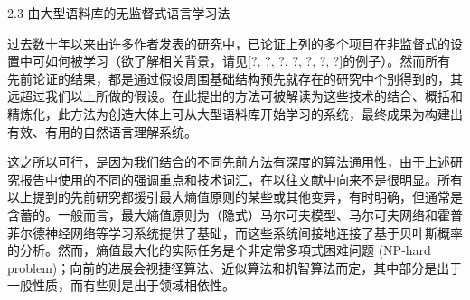 2.3 由大型语料库的无监督式语言学习法

过去数十年以来由许多作者发表的研究中，已论证上列的多个项目在非监督式的设置中可如何被学习（欲了解相关背景，请见[?, ?, ?, ?, ?, ?, ?]的例子）。然而所有先前论证的结果，都是通过假设周围基础结构预先就存在的研究中个别得到的，其远超过我们以上所做的假设。在此提出的方法可被解读为这些技术的结合、概括和精炼化，此方法为创造大体上可从大型语料库开始学习的系统，最终成果为构建出有效、有用的自然语言理解系统。

这之所以可行，是因为我们结合的不同先前方法有深度的算法通用性，由于上述研究报告中使用的不同的强调重点和技术词汇，在以往文献中向来不是很明显。所有以上提到的先前研究都援引最大熵值原则的某些或其他变异，有时明确，但通常是含蓄的。一般而言，最大熵值原则为（隐式）马尔可夫模型、马尔可夫网络和霍普菲尔德神经网络等学习系统提供了基础，而这些系统间接地连接了基于贝叶斯概率的分析。然而，熵值最大化的实际任务是个非定常多項式困难问题 (NP-hard problem)；向前的进展会视捷径算法、近似算法和机智算法而定，其中部分是出于一般性质，而有些则是出于领域相依性。

